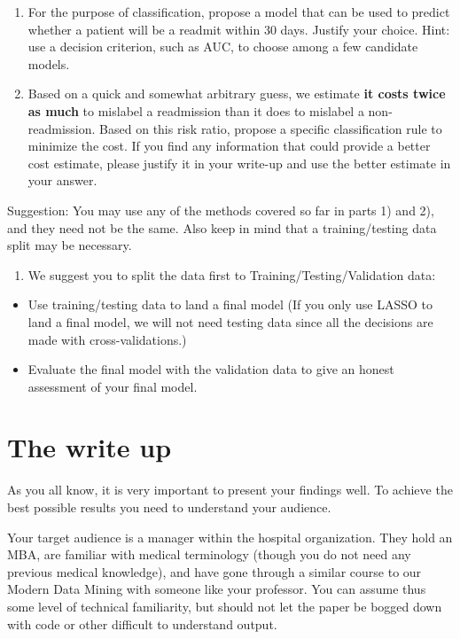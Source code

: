 \documentclass[
]{article}
\providecommand{\tightlist}{%
  \setlength{\itemsep}{0pt}\setlength{\parskip}{0pt}}
\begin{document}
\begin{enumerate}
\def\labelenumi{\arabic{enumi})}
\setcounter{enumi}{1}
\item
  For the purpose of classification, propose a model that can be used to
  predict whether a patient will be a readmit within 30 days. Justify
  your choice. Hint: use a decision criterion, such as AUC, to choose
  among a few candidate models.
\item
  Based on a quick and somewhat arbitrary guess, we estimate \textbf{it
  costs twice as much} to mislabel a readmission than it does to
  mislabel a non-readmission. Based on this risk ratio, propose a
  specific classification rule to minimize the cost. If you find any
  information that could provide a better cost estimate, please justify
  it in your write-up and use the better estimate in your answer.
\end{enumerate}

Suggestion: You may use any of the methods covered so far in parts 1)
and 2), and they need not be the same. Also keep in mind that a
training/testing data split may be necessary.

\begin{enumerate}
\def\labelenumi{\arabic{enumi})}
\setcounter{enumi}{3}
\tightlist
\item
  We suggest you to split the data first to Training/Testing/Validation
  data:
\end{enumerate}

\begin{itemize}
\item
  Use training/testing data to land a final model (If you only use LASSO
  to land a final model, we will not need testing data since all the
  decisions are made with cross-validations.)
\item
  Evaluate the final model with the validation data to give an honest
  assessment of your final model.
\end{itemize}

\hypertarget{the-write-up}{%
\section{The write up}\label{the-write-up}}

As you all know, it is very important to present your findings well. To
achieve the best possible results you need to understand your audience.

Your target audience is a manager within the hospital organization. They
hold an MBA, are familiar with medical terminology (though you do not
need any previous medical knowledge), and have gone through a similar
course to our Modern Data Mining with someone like your professor. You
can assume thus some level of technical familiarity, but should not let
the paper be bogged down with code or other difficult to understand
output.
\end{document}
